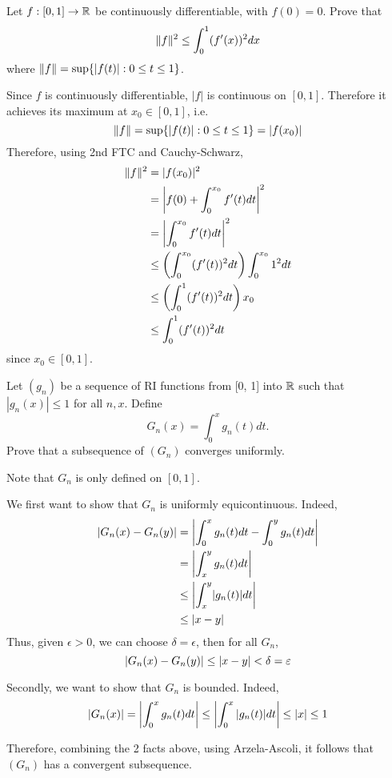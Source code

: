 \documentclass[a4paper, 12pt]{article}
\begin{document}
\begin{problem} 
Let $f: [0, 1] \to \bbr$ be continuously differentiable, with $f(0) = 0$. Prove that \[
    \norm{f}^2 \leq \int_0^1 (f'(x))^2 dx
\]
where $\norm{f} = \sup\{|f(t)|: 0\leq t \leq 1\}$.
\end{problem}
\begin{solution}
    Since $f$ is continuously differentiable, $|f|$ is continuous on $[0, 1]$. Therefore it achieves its maximum at $x_0 \in [0, 1]$, i.e. \[
        \norm{f} = \sup\{|f(t)|: 0\leq t \leq 1\} = |f(x_0)|
    \]
    Therefore, using 2nd FTC and Cauchy-Schwarz,
    \begin{align*}
        \norm{f}^2 & = |f(x_0)|^2                                                      \\
                   & = \abs*{f(0) + \int_{0}^{x_0}f'(t) dt}^2                          \\
                   & = \abs*{\int_{0}^{x_0}f'(t) dt}^2                                 \\
                   & \leq \left(\int_{0}^{x_0}(f'(t))^2 dt\right) \int_{0}^{x_0}1^2 dt \\
                   & \leq \left(\int_{0}^{1}(f'(t))^2 dt \right) x_0                   \\
                   & \leq \int_{0}^{1}(f'(t))^2 dt
    \end{align*}
    since $x_0 \in [0, 1]$.
\end{solution}

\begin{problem} 
Let $(g_n)$ be a sequence of RI functions from [0, 1] into $\bbr$ such that $|g_n(x)| \leq 1$ for all $n, x$. Define \[
    G_n(x) = \int_0^xg_n(t) dt.
\]
Prove that a subsequence of $(G_n)$ converges uniformly.
\end{problem}
\begin{solution}
    Note that $G_n$ is only defined on $[0, 1]$.

    We first want to show that $G_n$ is uniformly equicontinuous. Indeed,
    \begin{align*}
        \abs{G_n(x) - G_n(y)} & = \abs*{\int_{0}^{x}g_n(t)dt - \int_{0}^{y}g_n(t)dt} \\
                              & = \abs*{\int_{x}^{y}g_n(t) dt}                       \\
                              & \leq \abs*{\int_{x}^{y}\abs{g_n(t)}dt}               \\
                              & \leq \abs{x-y}
    \end{align*}
    Thus, given $\epsilon > 0$, we can choose $\delta = \epsilon$, then for all $G_n$, \[
        \abs{G_n(x) - G_n(y)} \leq \abs{x-y} < \delta = \epsilon
    \]

    Secondly, we want to show that $G_n$ is bounded. Indeed,
    \[
        |G_n(x)| = \left|\int_{0}^{x}g_n(t) dt \right| \leq \left|\int_{0}^{x}|g_n(t)| dt\right| \leq \abs*{x} \leq 1
    \]

    Therefore, combining the 2 facts above, using Arzela-Ascoli, it follows that $(G_n)$ has a convergent subsequence.
\end{solution}
\end{document}
